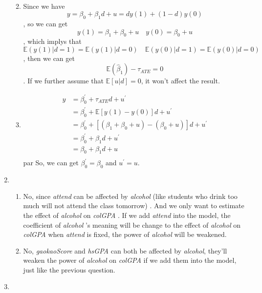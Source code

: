 \documentclass{article}
\begin{document}
\begin{enumerate}
\begin{enumerate}
\begin{equation}
\begin{aligned}
            \end{aligned}
            \nonumber
        \end{equation}
        \item Since we have $$
            y=\beta_0+\beta_1d+u=dy(1)+(1-d)y(0)
        $$ , so we can get $$
            y(1)=\beta_1+\beta_0+u \quad y(0)=\beta_0+u
        $$ , which implys that $$
            \mathbb{E}(y(1)|d=1)=\mathbb{E}(y(1)|d=0) \quad \mathbb{E}(y(0)|d=1)=\mathbb{E}(y(0)|d=0)
        $$ , then we can get $$
            \mathbb{E}(\hat{\beta}_1)-\tau_{ATE}=0
        $$ .
        If we further assume that $\mathbb{E}[u|d]=0$, it won't affect the result.
        \item \begin{equation}
            \begin{aligned}
                y
                &=\beta_0^{'}+\tau_{ATE}d+u^{'} \\
                &=\beta_0^{'}+\mathbb{E}[y(1)-y(0)]d+u^{'} \\
                &=\beta_0^{'}+[(\beta_1+\beta_0+u)-(\beta_0+u)]d+u^{'} \\
                &=\beta_0^{'}+\beta_1d+u^{'} \\
                &=\beta_0+\beta_1d+u \\
            \end{aligned}
            \nonumber
        \end{equation} par
        So, we can get $\beta_0^{'}=\beta_0$ and $u^{'}=u$.
    \end{enumerate}
    \item \begin{enumerate}
        \item No, since \textit{attend} can be affected by \textit{alcohol} (like students who drink too much will not attend the class tomorrow) .
        And we only want to estimate the effect of \textit{alcohol} on \textit{colGPA} .
        If we add \textit{attend} into the model, the coefficient of \textit{alcohol} 's meaning will be change to the effect of \textit{alcohol} on \textit{colGPA} when \textit{attend} is fixed, the power of \textit{alcohol} will be weakened.
        \item No, \textit{gaokaoScore} and \textit{hsGPA} can both be affected by \textit{alcohol}, they'll weaken the power of \textit{alcohol} on \textit{colGPA} if we add them into the model, just like the previous question.
    \end{enumerate}
    \item \begin{enumerate}

\end{enumerate}
\end{enumerate}
\end{document}
